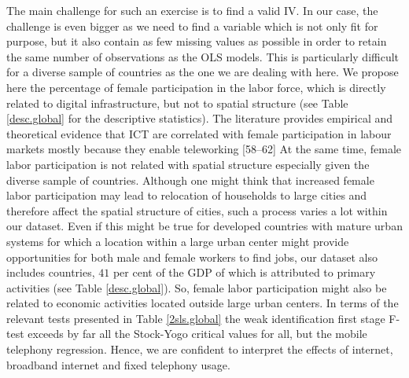 \documentclass[10pt,letterpaper]{article}
\begin{document}
The main challenge for such an exercise is to find a valid IV. In our
case, the challenge is even bigger as we need to find a variable which
is not only fit for purpose, but it also contain as few missing values
as possible in order to retain the same number of observations as the
OLS models. This is particularly difficult for a diverse sample of
countries as the one we are dealing with here. We propose here the
percentage of female participation in the labor force, which is directly
related to digital infrastructure, but not to spatial structure (see
Table \ref{desc.global} for the descriptive statistics). \color{blue}
The literature provides empirical and theoretical evidence that ICT are
correlated with female participation in labour markets mostly because
they enable teleworking {[}58--62{]} \color{black} At the same time,
female labor participation is not related with spatial structure
especially given the diverse sample of countries. Although one might
think that increased female labor participation may lead to relocation
of households to large cities and therefore affect the spatial structure
of cities, such a process varies a lot within our dataset. Even if this
might be true for developed countries with mature urban systems for
which a location within a large urban center might provide opportunities
for both male and female workers to find jobs, our dataset also includes
countries, \(41\) per cent of the GDP of which is attributed to primary
activities (see Table \ref{desc.global}). So, female labor participation
might also be related to economic activities located outside large urban
centers. In terms of the relevant tests presented in Table
\ref{2sls.global} the weak identification first stage F-test exceeds by
far all the Stock-Yogo critical values for all, but the mobile telephony
regression. Hence, we are confident to interpret the effects of
internet, broadband internet and fixed telephony usage.
\end{document}
